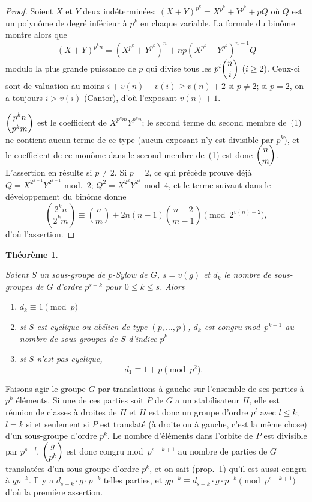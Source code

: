 \documentclass[12pt]{amsart}
\theoremstyle{plain}
\newtheorem{theoreme}[lemme]{Théorème}
\begin{document}
\begin{proof}
Soient $X$ et $Y$ deux indéterminées; $(X+Y)^{p^k} = X^{p^k} + Y^{p^k} + pQ$ où $Q$ est un polynôme de degré inférieur à $p^k$ en chaque variable. La formule du binôme montre alors que
\begin{equation}
(X+Y)^{p^k n} = (X^{p^k} + Y^{p^k})^n + np(X^{p^k} + Y^{p^k})^{n-1}Q
\end{equation}
modulo la plus grande puissance de $p$ qui divise tous les $p^i \dbinom{n}{i}$ ($i \geqslant 2$). Ceux-ci sont de valuation au moins $i + v(n) - v(i) \geqslant v(n) + 2$ si $p \neq 2$; si $p = 2$, on a toujours $i > v(i)$ (Cantor), d'où l'exposant $v(n) + 1$.

$\dbinom{p^k n}{p^k m}$ est le coefficient de $X^{p^k m}Y^{p^k n}$; le second terme du second membre de~(1) ne contient aucun terme de ce type (aucun exposant n'y est divisible par $p^k$), et le coefficient de ce monôme dans le second membre de~(1) est donc $\dbinom{n}{m}$. L'assertion en résulte si $p \neq 2$. Si $p = 2$, ce qui précède prouve déjà $Q = X^{2^{k-1}}Y^{2^{k-1}}$ mod.~$2$; $Q^2 = X^{2^k}Y^{2^k}$ mod~$4$, et le terme suivant dans le développement du binôme donne
\[
\binom{2^k n}{2^k m} \equiv \binom{n}{m} + 2n(n-1)\binom{n-2}{m-1} \pmod{2^{v(n)+2}},
\]
d'où l'assertion.
\end{proof}

\begin{theoreme}\ \par
Soient $S$ un sous-groupe de $p$-Sylow de $G$, $s = v(g)$ et $d_k$ le nombre de sous-groupes de $G$ d'ordre $p^{s-k}$ pour $0 \leqslant k \leqslant s$. Alors
\begin{enumerate}
\item[(i)] $d_k \equiv 1 \pmod p$
\item[(ii)] si $S$ est cyclique ou abélien de type $(p,\dots,p)$, $d_k$ est congru mod~$p^{k+1}$ au nombre de sous-groupes de $S$ d'indice $p^k$
\item[(iii)] si $S$ n'est pas cyclique,
\[
d_1 \equiv 1 + p \pmod{p^2}.
\]
\end{enumerate}
\end{theoreme}

Faisons agir le groupe $G$ par translations à gauche sur l'ensemble de ses parties à $p^k$ éléments. Si une de ces parties soit $P$ de $G$ a un stabilisateur $H$, elle est réunion de classes à droites de $H$ et $H$ est donc un groupe d'ordre $p^l$ avec $l \leqslant k$; $l = k$ si et seulement si $P$ est translaté (à droite ou à gauche, c'est la même chose) d'un sous-groupe d'ordre $p^k$. Le nombre d'éléments dans l'orbite de $P$ est divisible par $p^{s-l}$. $\dbinom{g}{p^k}$ est donc congru mod~$p^{s-k+1}$ au nombre de parties de $G$ translatées d'un sous-groupe d'ordre $p^k$, et on sait (prop.~1) qu'il est aussi congru à $gp^{-k}$. Il y a $d_{s-k} \cdot g \cdot p^{-k}$ telles parties, et $gp^{-k} \equiv d_{s-k} \cdot g \cdot p^{-k} \pmod{p^{s-k+1}}$ d'où la première assertion.
\end{document}
